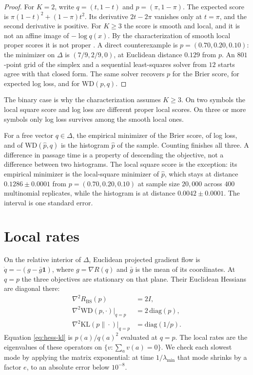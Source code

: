 \documentclass[10pt]{article}
\newcommand{\BS}{\mathrm{BS}}
\newcommand{\WD}{\mathrm{WD}}
\newcommand{\KL}{\mathrm{KL}}
\begin{document}
\begin{proof}
For $K=2$, write $q=(t,1-t)$ and $p=(\pi,1-\pi)$.
The expected score is $\pi(1-t)^2+(1-\pi)t^2$.
Its derivative $2t-2\pi$ vanishes only at $t=\pi$, and the second derivative is positive.
For $K\ge 3$ the score is smooth and local, and it is not an affine image of $-\log q(x)$.
By the characterization of smooth local proper scores it is not proper \citep{bernardo1979,mit67800}.
A direct counterexample is $p=(0.70,0.20,0.10)$: the minimizer on $\Delta$ is $(7/9,2/9,0)$, at Euclidean distance $0.129$ from $p$.
An $801$-point grid of the simplex and a sequential least-squares solver from $12$ starts agree with that closed form.
The same solver recovers $p$ for the Brier score, for expected log loss, and for $\WD(p,q)$.
\end{proof}

The binary case is why the characterization assumes $K\ge 3$.
On two symbols the local square score and log loss are different proper local scores.
On three or more symbols only log loss survives among the smooth local ones.

For a free vector $q\in\Delta$, the empirical minimizer of the Brier score, of log loss, and of $\WD(\hat p,q)$ is the histogram $\hat p$ of the sample.
Counting finishes all three.
A difference in passage time is a property of descending the objective, not a difference between two histograms.
The local square score is the exception: its empirical minimizer is the local-square minimizer of $\hat p$, which stays at distance $0.1286\pm 0.0001$ from $p=(0.70,0.20,0.10)$ at sample size $20{,}000$ across $400$ multinomial replicates, while the histogram is at distance $0.0042\pm 0.0001$.
The interval is one standard error.

\section{Local rates}
\label{sec:rates}

On the relative interior of $\Delta$, Euclidean projected gradient flow is $\dot q=-(g-\bar g\mathbf{1})$, where $g=\nabla R(q)$ and $\bar g$ is the mean of its coordinates.
At $q=p$ the three objectives are stationary on that plane.
Their Euclidean Hessians are diagonal there:
\begin{align}
\nabla^2 R_{\BS}(p) &= 2I, \label{eq:hess-brier}\\
\nabla^2 \WD(p,\cdot)\big|_{q=p} &= 2\,\mathrm{diag}(p), \label{eq:hess-wd}\\
\nabla^2 \KL(p\|\cdot)\big|_{q=p} &= \mathrm{diag}(1/p). \label{eq:hess-kl}
\end{align}
Equation \eqref{eq:hess-kl} is $p(a)/q(a)^2$ evaluated at $q=p$.
The local rates are the eigenvalues of these operators on $\{v:\sum_a v(a)=0\}$.
We check each slowest mode by applying the matrix exponential: at time $1/\lambda_{\min}$ that mode shrinks by a factor $e$, to an absolute error below $10^{-8}$.
\end{document}
